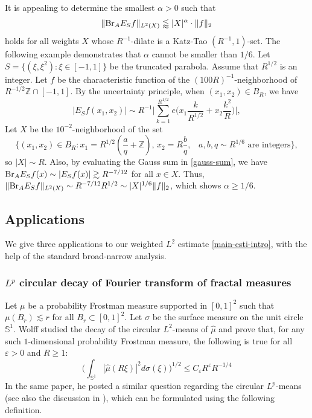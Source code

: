 \documentclass{amsart}
\numberwithin{equation}{section}
\newcommand{\al}{\alpha}
\newcommand{\e}{\varepsilon}
\newcommand{\si}{\sigma}
\newcommand{\wh}{\widehat}
\newcommand{\ZZ}{\mathbb{Z}}
\newcommand{\ZS}{\mathbb{S}}
\newcommand{\BR}{{\rm{Br}}}
\begin{document}
It is appealing to determine the smallest $\al>0$ such that  
\begin{equation}
    \|\BR_AE_Sf\|_{L^2(X)}\lessapprox|X|^{\al}\cdot\|f\|_2
\end{equation}
holds for all weights $X$ whose $R^{-1}$-dilate is a Katz-Tao $(R^{-1},1)$-set.
The following example demonstrates that $\al$ cannot be smaller than $1/6$.
Let $S=\{(\xi,\xi^2):\xi\in[-1,1]\}$ be the truncated parabola.
Assume that $R^{1/2}$ is an integer.
Let $f$ be the characteristic function of the $(100R)^{-1}$-neighborhood of $R^{-1/2}\ZZ\cap[-1,1]$.
By the uncertainty principle, when $(x_1,x_2)\in B_R$, we have
\begin{equation}
\label{gauss-sum}
    |E_Sf(x_1,x_2)|\sim R^{-1}\Big|\sum_{k=1}^{R^{1/2}}e\big(x_1\frac{k}{R^{1/2}}+x_2\frac{k^2}{R}\big)\Big|,
\end{equation}
Let $X$ be the $10^{-2}$-neighborhood of the set 
\begin{equation}
    \{(x_1,x_2)\in B_R: x_1=R^{1/2}(\frac{a}{q}+\ZZ),\,x_2=R\frac{b}{q},\, \text{  $a,b,q\sim R^{1/6}$ are  integers}\},
\end{equation}
so $|X|\sim R$.
Also, by evaluating the Gauss sum in \eqref{gauss-sum}, we have $\BR_A E_Sf(x)\sim |E_Sf(x)|\gtrsim R^{-7/12}$ for all $x\in X$.
Thus, $\|\BR_AE_Sf\|_{L^2(X)}\sim R^{-7/12}R^{1/2}\sim |X|^{1/6}\|f\|_2$, which shows $\al\geq 1/6$.


\medskip


\subsection{Applications}

We give three applications to our weighted $L^2$ estimate \eqref{main-esti-intro}, with the help of the standard broad-narrow analysis.

\smallskip

\subsubsection{$L^p$ circular decay of Fourier transform of fractal measures}


Let $\mu$ be a probability Frostman measure supported in $[0,1]^2$ such that $\mu(B_r)\lesssim r$ for all $B_r\subset [0,1]^2$.
Let $\si$ be the surface measure on the unit circle $\ZS^1$.
Wolff \cite{Wolff-circular} studied the decay of the circular $L^2$-means of $\wh \mu$ and prove that, for any such $1$-dimensional probability Frostman measure, the following is true for all $\e>0$ and $R\geq1$:
\begin{equation}
\label{wolff-l2-means}
    \Big(\int_{\ZS^1}|\wh \mu(R\xi)|^2d\si(\xi)\Big)^{1/2}\leq C_\e R^\e R^{-1/4}
\end{equation}
In the same paper, he posted a similar question regarding the circular $L^p$-means (see also the discussion in \cite[Section 10.2]{Guth-survey}), which can be formulated using the following definition.
\end{document}
